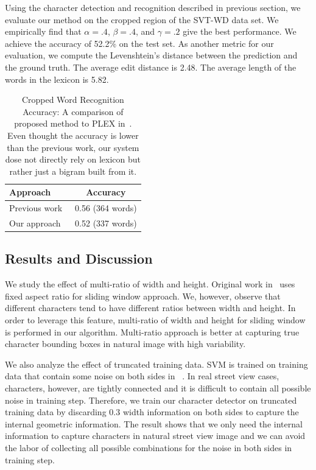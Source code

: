 \documentclass[10pt,twocolumn,letterpaper]{article}
\begin{document}
Using the character detection and recognition described in previous section, we evaluate our method on the cropped region of the SVT-WD data set. We empirically find that $\alpha=.4$, $\beta=.4$, and $\gamma=.2$ give the best performance. We achieve the accuracy of 52.2\% on the test set. As another metric for our evaluation, we compute the Levenshtein's distance between the prediction and the ground truth. The average edit distance is 2.48. The average length of the words in the lexicon is 5.82.

\begin{table}
\begin{center}
\begin{tabular}{|l|c|}
\hline
Approach & Accuracy \\
\hline\hline
Previous work~\cite{417}  & 0.56 (364 words) \\
Our approach & 0.52 (337 words)\\
\hline
\end{tabular}
\end{center}
\caption{Cropped Word Recognition Accuracy: A comparison of proposed method to PLEX in~\cite{417}. Even thought the accuracy is lower than the previous work, our system dose not directly rely on lexicon but rather just a bigram built from it.}
\label{table:compare}
\end{table}

\subsection{Results and Discussion}

We study the effect of multi-ratio of width and height. Original work in~\cite{417} uses fixed aspect ratio for sliding window approach. We, however, observe that different characters tend to have different ratios between width and height. In order to leverage this feature, multi-ratio of width and height for sliding window is performed in our algorithm. Multi-ratio approach is better at capturing true character bounding boxes in natural image with high variability.

We also analyze the effect of truncated training data. SVM is trained on training data that contain some noise on both sides in~\cite{417} . In real street view cases, characters, however, are tightly connected and it is difficult to contain all possible noise in training step. Therefore, we train our character detector on truncated training data by discarding $0.3$ width information on both sides to capture the internal geometric information. The result shows that we only need the internal information to capture characters in natural street view image and we can avoid the labor of collecting all possible combinations for the noise in both sides in training step.
\end{document}
